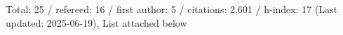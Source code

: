 Total: 25 / refereed: 16 / first author: 5 / citations: 2,601 / h-index: 17 (Last updated: 2025-06-19), List attached below